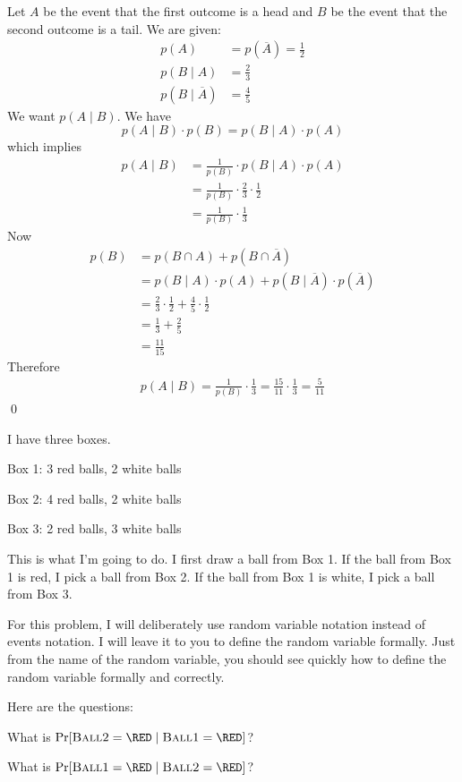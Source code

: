 Let $A$ be the event that the first outcome is a head
and $B$ be the event that the second outcome is a tail.
We are given:
\begin{align*}
p(A) &= p(\overline A) = \frac{1}{2} \\
p(B \mid A) &= \frac{2}{3} \\
p(B \mid \overline A) &= \frac{4}{5}
\end{align*}
We want $p(A \mid B)$.
We have
\[
p(A \mid B) \cdot p(B) = p(B \mid A) \cdot p(A)
\]
which implies
\begin{align*}
p(A \mid B) 
&= \frac{1}{p(B)} \cdot p(B \mid A) \cdot p(A) \\
&= \frac{1}{p(B)} \cdot \frac{2}{3} \cdot \frac{1}{2} \\
&= \frac{1}{p(B)} \cdot \frac{1}{3}
\end{align*}
Now
\begin{align*}
p(B) 
&= p(B \cap A) + p(B \cap \overline A) \\
&= p(B \mid A) \cdot p(A) + p(B \mid \overline A) \cdot p(\overline A) \\
&= \frac{2}{3} \cdot \frac{1}{2} 
   + 
   \frac{4}{5} \cdot \frac{1}{2} \\
&= \frac{1}{3} + \frac{2}{5} \\
&= \frac{11}{15}
\end{align*}
Therefore
\begin{align*}
p(A \mid B) 
= \frac{1}{p(B)} \cdot \frac{1}{3} 
= \frac{15}{11} \cdot \frac{1}{3}
=\frac{5}{11}
\end{align*}
\qed


\newpage
\newcommand\BALLONE{\text{\textsc{Ball1}}}
\newcommand\BALLTWO{\text{\textsc{Ball2}}}
\begin{ex}
I have three boxes. 
\begin{tightlist}
\item Box 1: 3 red balls, 2 white balls
\item Box 2: 4 red balls, 2 white balls
\item Box 3: 2 red balls, 3 white balls
\end{tightlist}
This is what I'm going to do. 
I first draw a ball from Box 1.
If the ball from Box 1 is red, I pick a ball from Box 2.
If the ball from Box 1 is white, I pick a ball from Box 3.

For this problem,
I will deliberately use random variable notation instead of
events notation.
I will leave it to you to define the random variable formally.
Just from the name of the random variable, you should see quickly how to 
define the random variable formally and correctly.

Here are the questions:
\begin{tightlist}
\item What is $\Pr[\BALLTWO = \RED \mid \BALLONE = \RED]$?
\item What is $\Pr[\BALLONE = \RED \mid \BALLTWO = \RED]$?
\end{tightlist}
\end{ex}


